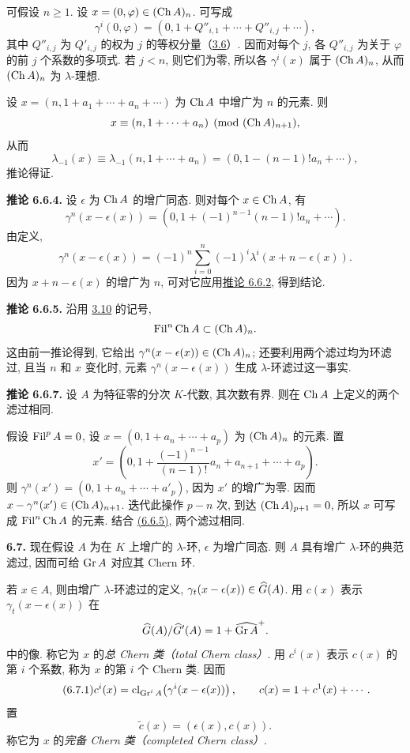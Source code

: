 可假设 \(n\ge1\). 设 \(x=(0,\varphi)\in(\operatorname{Ch} A)_n\). 可写成
\[
 \gamma^i(0,\varphi)
   =(0,1+Q''_{i,1}+\cdots+Q''_{i,j}+\cdots),
\]
其中 \(Q''_{i,j}\) 为 \(Q'_{i,j}\) 的权为 \(j\) 的等权分量（\hyperlink{sga6.e05.para.3-6}{3.6}）. 因而对每个 \(j\), 各 \(Q''_{i,j}\) 为关于 \(\varphi\) 的前 \(j\) 个系数的多项式. 若 \(j<n\), 则它们为零, 所以各 \(\gamma^i(x)\) 属于 \((\operatorname{Ch} A)_n\), 从而 \((\operatorname{Ch} A)_n\) 为 \(\lambda\)-理想.

设 \(x=(n,1+a_1+\cdots+a_n+\cdots)\) 为 \(\operatorname{Ch} A\) 中增广为 \(n\) 的元素. 则
\[
  x\equiv (n,1+\cdots+a_n)\pmod{(\operatorname{Ch} A)_{n+1}},
\]
从而
\[
  \lambda_{-1}(x)\equiv \lambda_{-1}(n,1+\cdots+a_n)
  =(0,1-(n-1)!a_n+\cdots),
\]
推论得证.

\textbf{推论 6.6.4.} 设 \(\epsilon\) 为 \(\operatorname{Ch} A\) 的增广同态. 则对每个 \(x\in\operatorname{Ch} A\), 有
\[
  \gamma^n(x-\epsilon(x))
  =
  (0,1+(-1)^{n-1}(n-1)!a_n+\cdots).
\]
由定义,
\[
  \gamma^n(x-\epsilon(x))
  =
  (-1)^n\sum_{i=0}^n(-1)^i\lambda^i(x+n-\epsilon(x)).
\]
因为 \(x+n-\epsilon(x)\) 的增广为 \(n\), 可对它应用\hyperlink{sga6.e05.cor.6-6-2}{推论 6.6.2}, 得到结论.

\textbf{推论 6.6.5.} 沿用 \hyperlink{sga6.e05.para.3-10}{3.10} 的记号,
\[
  \operatorname{Fil}^n\operatorname{Ch} A\subset(\operatorname{Ch} A)_n.
\]
这由前一推论得到, 它给出 \(\gamma^n(x-\epsilon(x))\in(\operatorname{Ch} A)_n\); 还要利用两个滤过均为环滤过, 且当 \(n\) 和 \(x\) 变化时, 元素 \(\gamma^n(x-\epsilon(x))\) 生成 \(\lambda\)-环滤过这一事实.

\textbf{推论 6.6.7.} 设 \(A\) 为特征零的分次 \(K\)-代数, 其次数有界. 则在 \(\operatorname{Ch} A\) 上定义的两个滤过相同.

假设 \(\operatorname{Fil}^p A=0\), 设 \(x=(0,1+a_n+\cdots+a_p)\) 为 \((\operatorname{Ch} A)_n\) 的元素. 置
\[
  x'=\left(0,1+\frac{(-1)^{n-1}}{(n-1)!}a_n+a_{n+1}+\cdots+a_p\right).
\]
则 \(\gamma^n(x')=(0,1+a_n+\cdots+a'_p)\), 因为 \(x'\) 的增广为零. 因而 \(x-\gamma^n(x')\in(\operatorname{Ch} A)_{n+1}\). 迭代此操作 \(p-n\) 次, 到达 \((\operatorname{Ch} A)_{p+1}=0\), 所以 \(x\) 可写成 \(\operatorname{Fil}^n\operatorname{Ch} A\) 的元素. 结合 \hyperlink{sga6.e05.cor.6-6-5}{(6.6.5)}, 两个滤过相同.

\textbf{6.7.} 现在假设 \(A\) 为在 \(K\) 上增广的 \(\lambda\)-环, \(\epsilon\) 为增广同态. 则 \(A\) 具有增广 \(\lambda\)-环的典范滤过, 因而可给 \(\operatorname{Gr} A\) 对应其 Chern 环.

若 \(x\in A\), 则由增广 \(\lambda\)-环滤过的定义, \(\gamma_t(x-\epsilon(x))\in\widehat G(A)\). 用 \(c(x)\) 表示 \(\gamma_t(x-\epsilon(x))\) 在
\[
  \widehat G(A)/\widehat G'(A)=1+\widehat{\operatorname{Gr} A}^{+}.
\]
中的像. 称它为 \(x\) 的\emph{总 Chern 类（total Chern class）}. 用 \(c^i(x)\) 表示 \(c(x)\) 的第 \(i\) 个系数, 称为 \(x\) 的第 \(i\) 个 Chern 类. 因而
\begin{equation}\tag{6.7.1}
  c^i(x)=\operatorname{cl}_{\operatorname{Gr}^iA}\!\left(\gamma^i(x-\epsilon(x))\right),
  \qquad
  c(x)=1+c^1(x)+\cdots .
\end{equation}
置
\begin{equation}\tag{6.7.2}
  \widetilde c(x)=(\epsilon(x),c(x)).
\end{equation}
称它为 \(x\) 的\emph{完备 Chern 类（completed Chern class）}.

